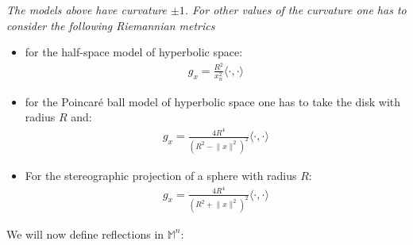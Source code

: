\begin{oss}
	\em The models above have curvature $\pm 1$. For other values of the curvature one has to consider the following Riemannian metrics
	\begin{itemize}
		\item for the half-space model of hyperbolic space:
		\begin{align*}
			g_x=\frac{R^2}{x_n^2} \langle\cdot, \cdot \rangle
		\end{align*}
		\item for the Poincaré ball model of hyperbolic space one has to take the disk with radius $R$ and:
		\begin{align*}
			g_x=\frac{4 R^4}{(R^2-\lVert x \rVert^2)^2} \langle\cdot, \cdot \rangle
		\end{align*}
		\item For the stereographic projection of a sphere with radius $R$:
		\begin{align*}
			g_x=\frac{4R^4}{(R^2+\lVert x \rVert^2)^2} \langle\cdot, \cdot \rangle
		\end{align*}
	\end{itemize}
\end{oss}

We will now define reflections in $\mathbb{M}^n$: 

